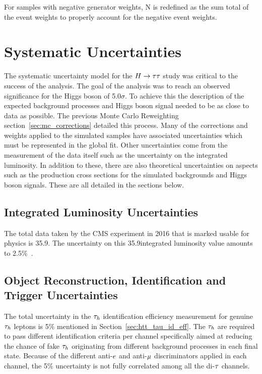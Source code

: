 For samples with negative generator weights, N is redefined as the sum total of the event weights to
properly account for the negative event weights.




\section{Systematic Uncertainties}
\label{sec:htt_systematics}

The systematic uncertainty model for the $H\to\tau\tau$ study was critical to the success of the analysis.
The goal of the analysis was to reach an observed significance for the Higgs boson of 5.0$\sigma$.
To achieve this the description of the expected background processes and Higgs boson signal
needed to be as close to data as possible. The previous Monte Carlo Reweighting 
section~\ref{sec:mc_corrections} detailed this process. Many of the corrections and weights applied
to the simulated samples have associated uncertainties which must be represented in the
global fit. Other uncertainties come from the measurement of the data itself such as the uncertainty
on the integrated luminosity. In addition to these, there are also theoretical uncertainties on
aspects such as the production cross sections for the simulated backgrounds and Higgs boson signals. 
These are all detailed in the sections below.


\subsection{Integrated Luminosity Uncertainties}
The total data taken by the CMS experiment in 2016 that is marked usable for physics is 35.9\fbinv. The uncertainty
on this 35.9\fbinv integrated luminosity value amounts to 2.5\%~\cite{CMS-PAS-LUM-17-001}.


\subsection{Object Reconstruction, Identification and Trigger Uncertainties}
The total uncertainty in the $\tau_{h}$ identification efficiency measurement for genuine $\tau_{h}$ leptons is 
5\% mentioned in Section~\ref{sec:htt_tau_id_eff}.
The $\tau_{h}$ are required to pass different identification criteria per channel
specifically aimed at reducing the chance of fake $\tau_{h}$ originating from different background
processes in each final state. Because of the different anti-$e$ and anti-$\mu$ discriminators
applied in each channel, the 5\% uncertainty is not fully correlated among all the di-$\tau$ channels.

